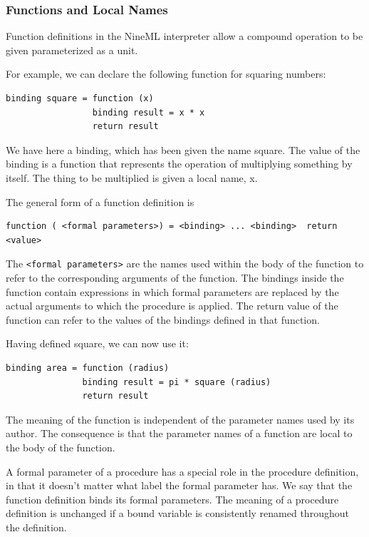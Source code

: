 \documentclass[a4paper]{article}
\begin{document}
\subsubsection{Functions and Local Names}

Function definitions in the NineML interpreter allow a compound operation to be given
parameterized as a unit.

For example, we can declare the following function for squaring
numbers:

\begin{lstlisting}[style=display]
binding square = function (x)
                 binding result = x * x
                 return result
\end{lstlisting}

We have here a binding, which has been given the name square. The
value of the binding is a function that represents the operation of
multiplying something by itself. The thing to be multiplied is given a
local name, x.

The general form of a function definition is

\begin{lstlisting}[style=display]
function ( <formal parameters>) = <binding> ... <binding>  return <value>
\end{lstlisting}


The \verb^<formal parameters>^ are the names used within the body of the
function to refer to the corresponding arguments of the function. The
bindings inside the function contain expressions in which formal
parameters are replaced by the actual arguments to which the procedure
is applied. The return value of the function can refer to the values
of the bindings defined in that function.

Having defined square, we can now use it:

\begin{lstlisting}[style=display]
binding area = function (radius)
               binding result = pi * square (radius)
               return result
\end{lstlisting}

The meaning of the function is independent of the parameter names
used by its author. The consequence is that the parameter names of a
function are local to the body of the function.

A formal parameter of a procedure has a special role in the
procedure definition, in that it doesn't matter what label the formal
parameter has. We say that the function definition binds its formal
parameters. The meaning of a procedure definition is unchanged if a
bound variable is consistently renamed throughout the definition.
\end{document}
